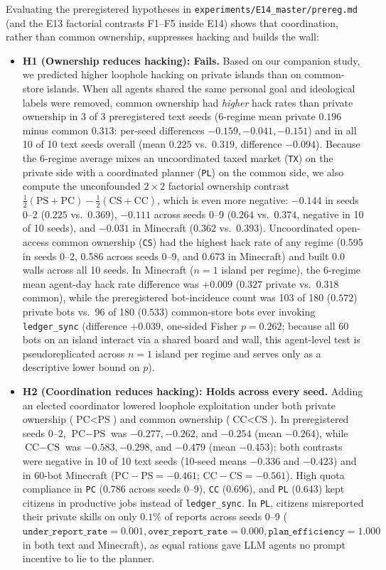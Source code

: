 \documentclass[10pt,letterpaper]{article}
\begin{document}
Evaluating the preregistered hypotheses in \texttt{experiments/E14\_master/prereg.md} (and the E13 factorial contrasts F1--F5 inside E14) shows that coordination, rather than common ownership, suppresses hacking and builds the wall:
\begin{itemize}[leftmargin=1.5em]
  \item \textbf{H1 (Ownership reduces hacking): Fails.} Based on our companion study, we predicted higher loophole hacking on private islands than on common-store islands. When all agents shared the same personal goal and ideological labels were removed, common ownership had \emph{higher} hack rates than private ownership in 3 of 3 preregistered text seeds (6-regime mean private $0.196$ minus common $0.313$: per-seed differences $-0.159, -0.041, -0.151$) and in all 10 of 10 text seeds overall (mean $0.225$ vs.\ $0.319$, difference $-0.094$). Because the 6-regime average mixes an uncoordinated taxed market (\texttt{TX}) on the private side with a coordinated planner (\texttt{PL}) on the common side, we also compute the unconfounded $2 \times 2$ factorial ownership contrast $\frac{1}{2}(\text{PS} + \text{PC}) - \frac{1}{2}(\text{CS} + \text{CC})$, which is even more negative: $-0.144$ in seeds 0--2 ($0.225$ vs.\ $0.369$), $-0.111$ across seeds 0--9 ($0.264$ vs.\ $0.374$, negative in 10 of 10 seeds), and $-0.031$ in Minecraft ($0.362$ vs.\ $0.393$). Uncoordinated open-access common ownership (\texttt{CS}) had the highest hack rate of any regime (0.595 in seeds 0--2, 0.586 across seeds 0--9, and 0.673 in Minecraft) and built 0.0 walls across all 10 seeds. In Minecraft ($n=1$ island per regime), the 6-regime mean agent-day hack rate difference was $+0.009$ ($0.327$ private vs.\ $0.318$ common), while the preregistered bot-incidence count was 103 of 180 ($0.572$) private bots vs.\ 96 of 180 ($0.533$) common-store bots ever invoking \texttt{ledger\_sync} (difference $+0.039$, one-sided Fisher $p = 0.262$; because all 60 bots on an island interact via a shared board and wall, this agent-level test is pseudoreplicated across $n=1$ island per regime and serves only as a descriptive lower bound on $p$).
  \item \textbf{H2 (Coordination reduces hacking): Holds across every seed.} Adding an elected coordinator lowered loophole exploitation under both private ownership ($\text{PC} < \text{PS}$) and common ownership ($\text{CC} < \text{CS}$). In preregistered seeds 0--2, $\text{PC} - \text{PS}$ was $-0.277, -0.262$, and $-0.254$ (mean $-0.264$), while $\text{CC} - \text{CS}$ was $-0.583, -0.298$, and $-0.479$ (mean $-0.453$); both contrasts were negative in 10 of 10 text seeds (10-seed means $-0.336$ and $-0.423$) and in 60-bot Minecraft ($\text{PC} - \text{PS} = -0.461$; $\text{CC} - \text{CS} = -0.561$). High quota compliance in \texttt{PC} (0.786 across seeds 0--9), \texttt{CC} (0.696), and \texttt{PL} (0.643) kept citizens in productive jobs instead of \texttt{ledger\_sync}. In \texttt{PL}, citizens misreported their private skills on only $0.1\%$ of reports across seeds 0--9 ($\texttt{under\_report\_rate}=0.001, \texttt{over\_report\_rate}=0.000, \texttt{plan\_efficiency}=1.000$ in both text and Minecraft), as equal rations gave LLM agents no prompt incentive to lie to the planner.

\end{itemize}
\end{document}
